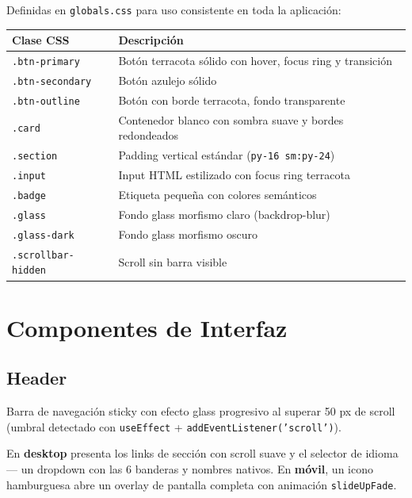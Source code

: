 \documentclass[12pt,a4paper,twoside,openright]{report}
\begin{document}
Definidas en \texttt{globals.css} para uso consistente en toda la aplicación:

\begin{longtable}{L{3.5cm} L{9cm}}
  \toprule
  \textbf{Clase CSS} & \textbf{Descripción} \\
  \midrule
  \texttt{.btn-primary} & Botón terracota sólido con hover, focus ring y transición \\
  \texttt{.btn-secondary} & Botón azulejo sólido \\
  \texttt{.btn-outline} & Botón con borde terracota, fondo transparente \\
  \texttt{.card} & Contenedor blanco con sombra suave y bordes redondeados \\
  \texttt{.section} & Padding vertical estándar (\texttt{py-16 sm:py-24}) \\
  \texttt{.input} & Input HTML estilizado con focus ring terracota \\
  \texttt{.badge} & Etiqueta pequeña con colores semánticos \\
  \texttt{.glass} & Fondo glass morfismo claro (backdrop-blur) \\
  \texttt{.glass-dark} & Fondo glass morfismo oscuro \\
  \texttt{.scrollbar-hidden} & Scroll sin barra visible \\
  \bottomrule
\end{longtable}

\chapter{Componentes de Interfaz}

\section{Header}

Barra de navegación sticky con efecto glass progresivo al superar 50 px de scroll
(umbral detectado con \texttt{useEffect} + \texttt{addEventListener('scroll')}).

En \textbf{desktop} presenta los links de sección con scroll suave y el selector de
idioma — un dropdown con las 6 banderas y nombres nativos. En \textbf{móvil},
un icono hamburguesa abre un overlay de pantalla completa con animación
\texttt{slideUpFade}.
\end{document}

